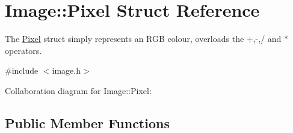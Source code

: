\hypertarget{structImage_1_1Pixel}{}\section{Image\+:\+:Pixel Struct Reference}
\label{structImage_1_1Pixel}


The \hyperlink{structImage_1_1Pixel}{Pixel} struct simply represents an R\+G\+B colour, overloads the +,-\/,/ and $\ast$ operators.  




{\ttfamily \#include $<$image.\+h$>$}



Collaboration diagram for Image\+:\+:Pixel\+:
\subsection*{Public Member Functions}
